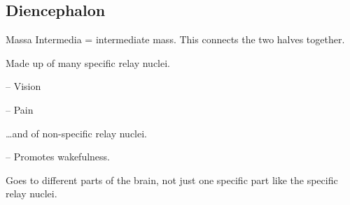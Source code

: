    \subsection{Diencephalon}

\begin{coloredlist}
    \item {}
    \begin{coloredlist}
        \item Massa Intermedia = intermediate mass. This connects the two halves together.
        \item Made up of many specific relay nuclei.
        \begin{coloredlist}
            \item {} -- Vision
            \item {} -- Pain
        \end{coloredlist}
        \item \dots and of non-specific relay nuclei.
        \begin{coloredlist}
            \item {} -- Promotes wakefulness.
            \begin{coloredlist}
                \item Goes to different parts of the brain, not just one specific part like the specific relay nuclei.
            \end{coloredlist}
        \end{coloredlist}
    \end{coloredlist}
\end{coloredlist}



